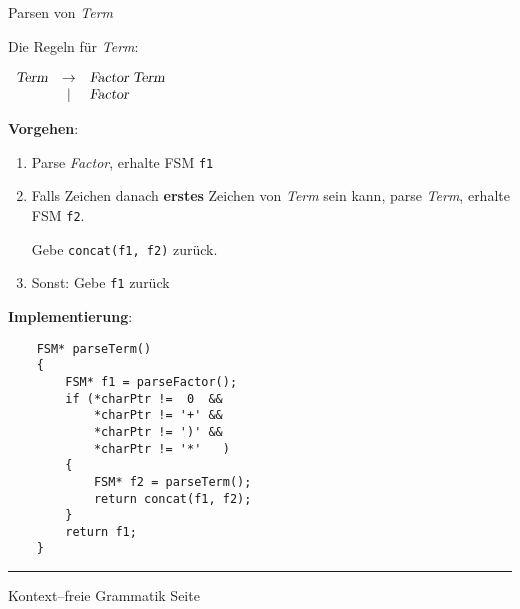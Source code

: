 
\begin{slide}{}
\normalsize

\begin{center}
Parsen von \textsl{Term}
\end{center}
\vspace*{0.5cm}

\footnotesize
Die Regeln f\"ur \textsl{Term}:

$
\begin{array}{lcl}
\textsl{Term} & \rightarrow & \textsl{Factor}\;\textsl{Term} \\
              & |           & \textsl{Factor}                \\
\end{array}
$

\textbf{Vorgehen}:
\begin{enumerate}
\item Parse \textsl{Factor}, erhalte FSM \texttt{f1}
\item Falls Zeichen danach \textbf{erstes} Zeichen von \textsl{Term} sein kann,
      parse \textsl{Term}, erhalte FSM \texttt{f2}.

      Gebe \texttt{concat(f1, f2)} zur\"uck.
\item Sonst: Gebe \texttt{f1} zur\"uck
\end{enumerate}
\textbf{Implementierung}:
\begin{verbatim}
    FSM* parseTerm() 
    {
        FSM* f1 = parseFactor();
        if (*charPtr !=  0  && 
            *charPtr != '+' && 
            *charPtr != ')' && 
            *charPtr != '*'   ) 
        {
            FSM* f2 = parseTerm();
            return concat(f1, f2);
        }
        return f1;
    }
\end{verbatim}

\vspace*{\fill}
\tiny \addtocounter{mypage}{1}
\rule{17cm}{1mm}
Kontext--freie Grammatik  \hspace*{\fill} Seite 
\end{slide}


